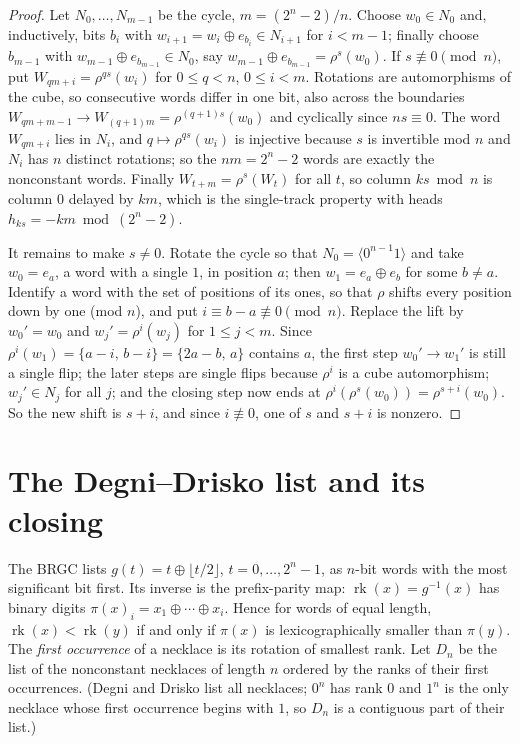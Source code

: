 \documentclass[11pt]{article}
\newcommand{\rk}{\operatorname{rk}}
\begin{document}
\begin{proof}
Let $N_0,\dots,N_{m-1}$ be the cycle, $m=(2^n-2)/n$. Choose $w_0\in N_0$ and, inductively, bits $b_i$ with
$w_{i+1}=w_i\oplus e_{b_i}\in N_{i+1}$ for $i<m-1$; finally choose $b_{m-1}$ with $w_{m-1}\oplus e_{b_{m-1}}\in N_0$,
say $w_{m-1}\oplus e_{b_{m-1}}=\rho^s(w_0)$. If $s\not\equiv 0\pmod n$, put $W_{qm+i}=\rho^{qs}(w_i)$ for
$0\le q<n$, $0\le i<m$. Rotations are automorphisms of the cube, so consecutive words differ in one bit, also across
the boundaries $W_{qm+m-1}\to W_{(q+1)m}=\rho^{(q+1)s}(w_0)$ and cyclically since $ns\equiv 0$. The word $W_{qm+i}$
lies in $N_i$, and $q\mapsto\rho^{qs}(w_i)$ is injective because $s$ is invertible mod $n$ and $N_i$ has $n$ distinct
rotations; so the $nm=2^n-2$ words are exactly the nonconstant words. Finally $W_{t+m}=\rho^{s}(W_t)$ for all $t$,
so column $ks \bmod n$ is column $0$ delayed by $km$, which is the single-track property with heads
$h_{ks}=-km \bmod (2^n-2)$.

It remains to make $s\ne 0$. Rotate the cycle so that $N_0=\langle 0^{n-1}1\rangle$ and take $w_0=e_a$, a word with a
single $1$, in position $a$; then $w_1=e_a\oplus e_b$ for some $b\ne a$. Identify a word with the set of positions of
its ones, so that $\rho$ shifts every position down by one (mod $n$), and put $i\equiv b-a\not\equiv 0\pmod n$. Replace
the lift by $w_0'=w_0$ and $w_j'=\rho^{i}(w_j)$ for $1\le j<m$. Since $\rho^i(w_1)=\{a-i,\,b-i\}=\{2a-b,\,a\}$
contains $a$, the first step $w_0'\to w_1'$ is still a single flip; the later steps are single flips because $\rho^i$ is
a cube automorphism; $w_j'\in N_j$ for all $j$; and the closing step now ends at $\rho^{i}(\rho^{s}(w_0))=
\rho^{s+i}(w_0)$. So the new shift is $s+i$, and since $i\not\equiv0$, one of $s$ and $s+i$ is nonzero.
\end{proof}

\section{The Degni--Drisko list and its closing}\label{sec:closing}

The BRGC lists $g(t)=t\oplus\lfloor t/2\rfloor$, $t=0,\dots,2^n-1$, as $n$-bit words with the most significant bit
first. Its inverse is the prefix-parity map: $\rk(x)=g^{-1}(x)$ has binary digits $\pi(x)_i=x_1\oplus\cdots\oplus x_i$.
Hence for words of equal length, $\rk(x)<\rk(y)$ if and only if $\pi(x)$ is lexicographically smaller than $\pi(y)$.
The \emph{first occurrence} of a necklace is its rotation of smallest rank. Let $D_n$ be the list of the nonconstant
necklaces of length $n$ ordered by the ranks of their first occurrences. (Degni and Drisko list all necklaces; $0^n$
has rank $0$ and $1^n$ is the only necklace whose first occurrence begins with $1$, so $D_n$ is a contiguous part of
their list.)
\end{document}
